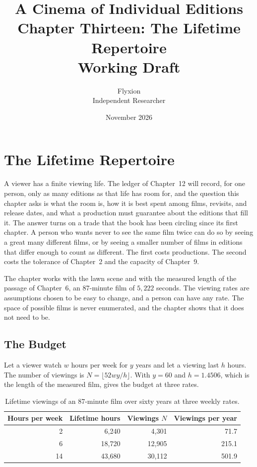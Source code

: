 \documentclass[11pt,twoside,openright]{book}
\title{\Huge\bfseries A Cinema of Individual Editions\\[1.2ex]
\large Chapter Thirteen: The Lifetime Repertoire\\[0.4ex]
\large Working Draft}
\author{Flyxion\\[0.3ex]\small Independent Researcher}
\date{November 2026}
\theoremstyle{plain}
\theoremstyle{definition}
\theoremstyle{remark}
\begin{document}
\frontmatter
\maketitle
\tableofcontents
\mainmatter
\setcounter{chapter}{12}

\chapter{The Lifetime Repertoire}
\label{ch:repertoire}

A viewer has a finite viewing life. The ledger of Chapter~12 will record, for one person, only as many editions as that life has room for, and the question this chapter asks is what the room is, how it is best spent among films, revisits, and release dates, and what a production must guarantee about the editions that fill it. The answer turns on a trade that the book has been circling since its first chapter. A person who wants never to see the same film twice can do so by seeing a great many different films, or by seeing a smaller number of films in editions that differ enough to count as different. The first costs productions. The second costs the tolerance of Chapter~2 and the capacity of Chapter~9.

The chapter works with the lawn scene and with the measured length of the passage of Chapter~6, an 87-minute film of $5{,}222$ seconds. The viewing rates are assumptions chosen to be easy to change, and a person can have any rate. The space of possible films is never enumerated, and the chapter shows that it does not need to be.

\section{The Budget}\label{sec:budget13}

Let a viewer watch $w$ hours per week for $y$ years and let a viewing last $h$ hours. The number of viewings is $N=\lfloor 52wy/h\rfloor$. With $y=60$ and $h=1.4506$, which is the length of the measured film,  gives the budget at three rates.

\begin{table}[ht]
\centering
\begin{tabular}{@{}rrrr@{}}
\toprule
Hours per week & Lifetime hours & Viewings $N$ & Viewings per year\\
\midrule
2 & 6{,}240 & 4{,}301 & 71.7\\
6 & 18{,}720 & 12{,}905 & 215.1\\
14 & 43{,}680 & 30{,}112 & 501.9\\
\bottomrule
\end{tabular}
\caption{Lifetime viewings of an 87-minute film over sixty years at three weekly rates.}\label{tab:budget13}
\end{table}
\end{document}
